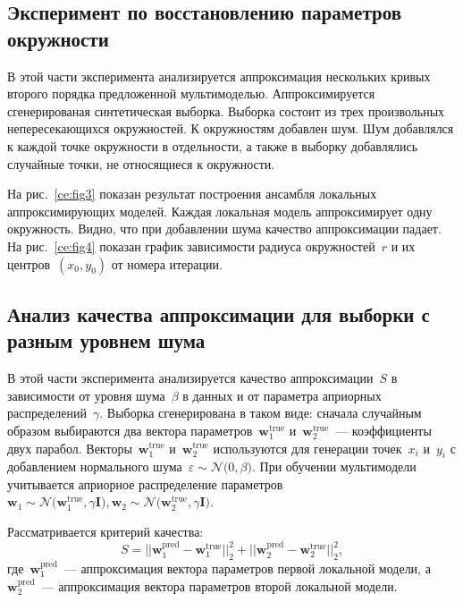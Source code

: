 \documentclass[12pt]{a&t}
\begin{document}
\subsection{Эксперимент по восстановлению параметров окружности}

В этой части эксперимента анализируется аппроксимация нескольких кривых второго порядка предложенной мультимоделью. Аппроксимируется сгенерированая синтетическая выборка. Выборка состоит из трех произвольных непересекающихся окружностей. К окружностям добавлен шум. Шум добавлялся к каждой точке окружности в отдельности, а также в выборку добавлялись случайные точки, не относящиеся к окружности.

На рис.~\ref{ce:fig3} показан результат построения ансамбля локальных аппроксимирующих моделей. Каждая локальная модель аппроксимирует одну окружность. Видно, что при добавлении шума качество аппроксимации падает.
На рис.~\ref{ce:fig4} показан график зависимости радиуса окружностей~$r$ и их центров~$(x_0, y_0)$ от номера итерации.

\subsection{Анализ качества аппроксимации для выборки с разным уровнем шума}

В этой части эксперимента анализируется качество аппроксимации~$S$ в зависимости от уровня шума~$\beta$ в данных и от параметра априорных распределений~$\gamma$. Выборка сгенерирована в таком виде: сначала случайным образом выбираются два вектора параметров~$\mathbf{w}^\text{true}_{1}$ и~$\mathbf{w}^\text{true}_{2}$~--- коэффициенты двух парабол. Векторы~$\mathbf {w}^\text {true}_{1}$ и~$\mathbf{w}^\text {true}_{2}$ используются для генерации точек~$x_i$ и~$y_i$ с добавлением нормального шума~$\varepsilon\sim\mathcal {N} \bigr(0,\beta\bigr)$.
При обучении мультимодели учитывается априорное распределение параметров~$\mathbf{w}_1\sim\mathcal{N}\bigr(\mathbf{w}^\text{true}_{1}, \gamma \mathbf{I}\bigr),\mathbf{w}_2\sim\mathcal{N}\bigr(\mathbf{w}^\text{true}_{2}, \gamma\mathbf{I}\bigr)$.

Рассматривается критерий качества:
\[
S = ||\mathbf{w}^\text{pred}_{1} - \mathbf{w}^\text{true}_{1}||^{2}_{2} + ||\mathbf{w}^\text{pred}_{2} - \mathbf{w}^\text{true}_{2}||^{2}_{2},
\]
где~$\mathbf{w}^\text{pred}_{1}$~--- аппроксимация вектора параметров первой локальной модели, а~$\mathbf{w}^\text{pred}_{2}$~--- аппроксимация вектора параметров второй локальной модели.
\end{document}
